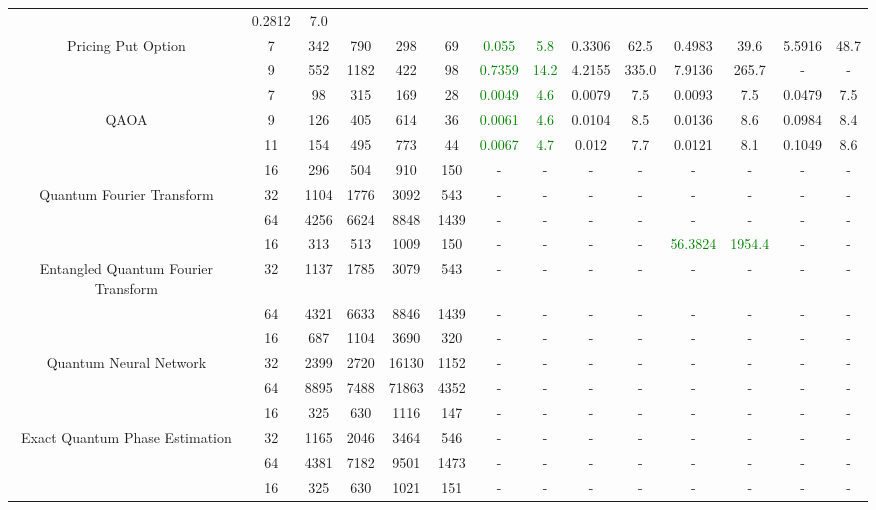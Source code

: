 \begin{table}[htb]
{\begin{tabular}{|c|c|c|c|c|c|c|c|c|c|c|c|c|c|}
 & 0.2812 & 7.0
 \\
Pricing Put Option & 
7 & 342 & 790 & 298 & 69
 & \textcolor{green}{0.055} & \textcolor{green}{5.8}
 & 0.3306 & 62.5
 & 0.4983 & 39.6
 & 5.5916 & 48.7
 \\
 & 
9 & 552 & 1182 & 422 & 98
 & \textcolor{green}{0.7359} & \textcolor{green}{14.2}
 & 4.2155 & 335.0
 & 7.9136 & 265.7
 & - & -
 \\
\hline
 & 
7 & 98 & 315 & 169 & 28
 & \textcolor{green}{0.0049} & \textcolor{green}{4.6}
 & 0.0079 & 7.5
 & 0.0093 & 7.5
 & 0.0479 & 7.5
 \\
QAOA & 
9 & 126 & 405 & 614 & 36
 & \textcolor{green}{0.0061} & \textcolor{green}{4.6}
 & 0.0104 & 8.5
 & 0.0136 & 8.6
 & 0.0984 & 8.4
 \\
 & 
11 & 154 & 495 & 773 & 44
 & \textcolor{green}{0.0067} & \textcolor{green}{4.7}
 & 0.012 & 7.7
 & 0.0121 & 8.1
 & 0.1049 & 8.6
 \\
\hline
 & 
16 & 296 & 504 & 910 & 150
 & - & -
 & - & -
 & - & -
 & - & -
 \\
Quantum Fourier Transform & 
32 & 1104 & 1776 & 3092 & 543
 & - & -
 & - & -
 & - & -
 & - & -
 \\
 & 
64 & 4256 & 6624 & 8848 & 1439
 & - & -
 & - & -
 & - & -
 & - & -
 \\
\hline
 & 
16 & 313 & 513 & 1009 & 150
 & - & -
 & - & -
 & \textcolor{green}{56.3824} & \textcolor{green}{1954.4}
 & - & -
 \\
Entangled Quantum Fourier Transform & 
32 & 1137 & 1785 & 3079 & 543
 & - & -
 & - & -
 & - & -
 & - & -
 \\
 & 
64 & 4321 & 6633 & 8846 & 1439
 & - & -
 & - & -
 & - & -
 & - & -
 \\
\hline
 & 
16 & 687 & 1104 & 3690 & 320
 & - & -
 & - & -
 & - & -
 & - & -
 \\
Quantum Neural Network & 
32 & 2399 & 2720 & 16130 & 1152
 & - & -
 & - & -
 & - & -
 & - & -
 \\
 & 
64 & 8895 & 7488 & 71863 & 4352
 & - & -
 & - & -
 & - & -
 & - & -
 \\
\hline
 & 
16 & 325 & 630 & 1116 & 147
 & - & -
 & - & -
 & - & -
 & - & -
 \\
Exact Quantum Phase Estimation & 
32 & 1165 & 2046 & 3464 & 546
 & - & -
 & - & -
 & - & -
 & - & -
 \\
 & 
64 & 4381 & 7182 & 9501 & 1473
 & - & -
 & - & -
 & - & -
 & - & -
 \\
\hline
 & 
16 & 325 & 630 & 1021 & 151
 & - & -
 & - & -
 & - & -
 & - & -
 \\

\end{tabular}}
\end{table}
